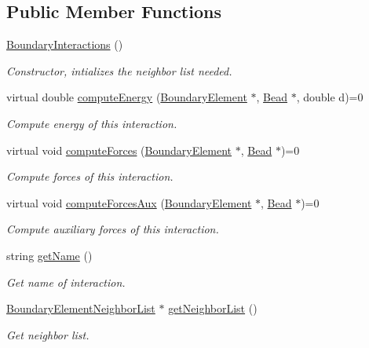 \subsection*{Public Member Functions}
\begin{DoxyCompactItemize}
\item 
\hyperlink{classBoundaryInteractions_aad77fa96cf328adb581dda20c68eb313}{Boundary\+Interactions} ()
\begin{DoxyCompactList}\small\item\em Constructor, intializes the neighbor list needed. \end{DoxyCompactList}\item 
virtual double \hyperlink{classBoundaryInteractions_a78b34313aa441137288dea97cbf37912}{compute\+Energy} (\hyperlink{classBoundaryElement}{Boundary\+Element} $\ast$, \hyperlink{classBead}{Bead} $\ast$, double d)=0
\begin{DoxyCompactList}\small\item\em Compute energy of this interaction. \end{DoxyCompactList}\item 
virtual void \hyperlink{classBoundaryInteractions_a4280d211cec7be35730a7a7b6c5c4bd4}{compute\+Forces} (\hyperlink{classBoundaryElement}{Boundary\+Element} $\ast$, \hyperlink{classBead}{Bead} $\ast$)=0
\begin{DoxyCompactList}\small\item\em Compute forces of this interaction. \end{DoxyCompactList}\item 
virtual void \hyperlink{classBoundaryInteractions_a112697f0d9dd8884ef67f1ce81e892da}{compute\+Forces\+Aux} (\hyperlink{classBoundaryElement}{Boundary\+Element} $\ast$, \hyperlink{classBead}{Bead} $\ast$)=0
\begin{DoxyCompactList}\small\item\em Compute auxiliary forces of this interaction. \end{DoxyCompactList}\item 
string \hyperlink{classBoundaryInteractions_aece29831e11962476a9d6c016b5d4b86}{get\+Name} ()
\begin{DoxyCompactList}\small\item\em Get name of interaction. \end{DoxyCompactList}\item 
\hyperlink{classBoundaryElementNeighborList}{Boundary\+Element\+Neighbor\+List} $\ast$ \hyperlink{classBoundaryElementNLContainer_aa665161110c46e0a2af9f760c96afe19}{get\+Neighbor\+List} ()
\begin{DoxyCompactList}\small\item\em Get neighbor list. \end{DoxyCompactList}\end{DoxyCompactItemize}
